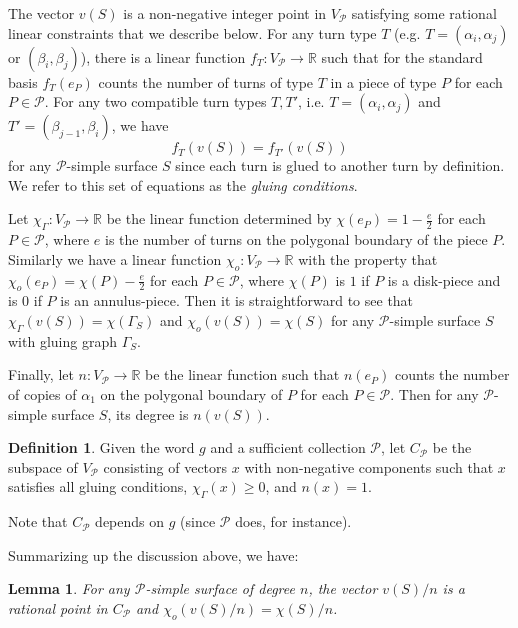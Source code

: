 \documentclass{amsart}
\newtheorem{lemma}[theorem]{Lemma}
\theoremstyle{definition}
\newtheorem{definition}[theorem]{Definition}
\numberwithin{equation}{section}
\theoremstyle{theorem}
\theoremstyle{remark}
\def\R{\mathbb R}
\begin{document}
	The vector $v(S)$ is a non-negative integer point in $V_\mathcal{P}$ satisfying some rational linear constraints that we describe below.
	For any turn type $T$ (e.g. $T=(\alpha_i,\alpha_j)$ or $(\beta_i,\beta_j)$), there is a linear function $f_T:V_\mathcal{P}\to\R$ such that for the standard basis $f_T(e_P)$ counts the number of turns of type $T$ in a piece of type $P$ for each $P\in\mathcal{P}$. For any two compatible turn types
	$T,T'$, i.e. $T=(\alpha_i,\alpha_j)$ and $T'=(\beta_{j-1},\beta_i)$, we have 
	$$f_T(v(S))=f_{T'}(v(S))$$
	for any $\mathcal{P}$-simple surface $S$ since each turn is glued to another turn by definition. We refer to this set of equations as the \emph{gluing conditions}.
	
	Let $\chi_\Gamma:V_\mathcal{P}\to\R$ be the linear function determined by $\chi(e_P)=1-\frac{e}{2}$ for each $P\in\mathcal{P}$, 
	where $e$ is the number of turns on the polygonal boundary of the piece $P$.
	Similarly we have a linear function $\chi_o:V_\mathcal{P}\to\R$ with the property that $\chi_o(e_P)=\chi(P)-\frac{e}{2}$ for each $P\in\mathcal{P}$, where $\chi(P)$ is $1$ if $P$ is a disk-piece and is $0$ if $P$ is an annulus-piece.
	Then it is straightforward to see that $\chi_\Gamma(v(S))=\chi(\Gamma_S)$ and $\chi_o(v(S))=\chi(S)$ for any $\mathcal{P}$-simple surface $S$ with gluing graph $\Gamma_S$.
	
	Finally, let $n:V_\mathcal{P}\to\R$ be the linear function such that $n(e_P)$ counts the number of copies of $\alpha_1$ on the polygonal boundary of $P$ for each $P\in\mathcal{P}$. Then for any $\mathcal{P}$-simple surface $S$, its degree is $n(v(S))$.
	
	
	\begin{definition}
		Given the word $g$ and a sufficient collection $\mathcal{P}$, let $C_\mathcal{P}$ be the subspace of $V_\mathcal{P}$ consisting of vectors $x$ with non-negative components such that $x$ satisfies all gluing conditions, $\chi_\Gamma(x)\ge0$, and $n(x)=1$.
	\end{definition}
	Note that $C_\mathcal{P}$ depends on $g$ (since $\mathcal{P}$ does, for instance).	
	
	Summarizing up the discussion above, we have:
	\begin{lemma}\label{lemma: surf to vect}
		For any $\mathcal{P}$-simple surface of degree $n$, the vector $v(S)/n$ is a rational point in $C_\mathcal{P}$ and $\chi_o(v(S)/n)=\chi(S)/n$.
	\end{lemma}
	
\end{document}
